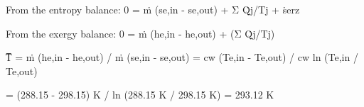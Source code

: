 From the entropy balance:  
0 = ṁ (se,in - se,out) + Σ Q̇j/Tj + ṡerz  

From the exergy balance:  
0 = ṁ (he,in - he,out) + (Σ Q̇j/Tj)  

T̅ = ṁ (he,in - he,out) / ṁ (se,in - se,out)  
= cw (Te,in - Te,out) / cw ln (Te,in / Te,out)  

= (288.15 - 298.15) K / ln (288.15 K / 298.15 K)  
= 293.12 K